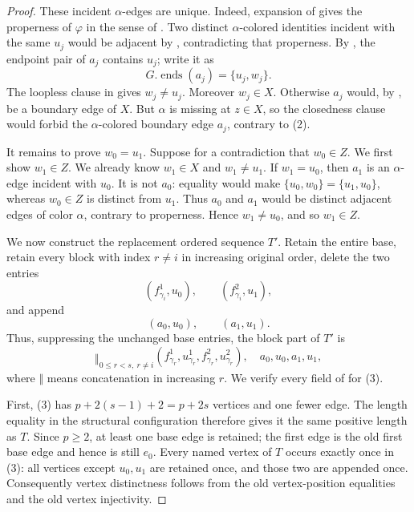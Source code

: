 \begin{proof}
These incident $\alpha$-edges are unique.  Indeed, expansion of
 gives the properness of $\varphi$ in the sense of
.  Two distinct $\alpha$-colored identities
incident with the same $u_j$ would be adjacent by
, contradicting that properness.  By
, the endpoint pair of $a_j$ contains $u_j$; write it
as
\[
 G.\operatorname{ends}(a_j)=\{u_j,w_j\}.
\]
The loopless clause in  gives $w_j\ne u_j$.
Moreover $w_j\in X$.  Otherwise $a_j$ would, by
, be a boundary edge of $X$.  But $\alpha$ is
missing at $z\in X$, so the closedness clause would forbid the
$\alpha$-colored boundary edge $a_j$, contrary to (2).

It remains to prove $w_0=u_1$.  Suppose for a contradiction that
$w_0\in Z$.  We first show $w_1\in Z$.  We already know $w_1\in X$ and
$w_1\ne u_1$.  If $w_1=u_0$, then $a_1$ is an $\alpha$-edge incident
with $u_0$.  It is not $a_0$: equality would make
$\{u_0,w_0\}=\{u_1,u_0\}$, whereas $w_0\in Z$ is distinct from $u_1$.
Thus $a_0$ and $a_1$ would be distinct adjacent edges of color $\alpha$,
contrary to properness.  Hence $w_1\ne u_0$, and so $w_1\in Z$.

We now construct the replacement ordered sequence $T'$.  Retain the
entire base, retain every block with index $r\ne i$ in increasing original
order, delete the two entries
\[
 (f^1_{\gamma_i},u_0),\qquad(f^2_{\gamma_i},u_1),
\]
and append
\[
 (a_0,u_0),\qquad(a_1,u_1).
\]
Thus, suppressing the unchanged base entries, the block part of $T'$ is
\[
 \mathop{\Vert}_{0\le r<s,\ r\ne i}
   (f^1_{\gamma_r},u^1_{\gamma_r},
    f^2_{\gamma_r},u^2_{\gamma_r}),
 \quad a_0,u_0,a_1,u_1,                                      \tag{3}
\]
where $\Vert$ means concatenation in increasing $r$.  We verify every
field of  for (3).

First, (3) has $p+2(s-1)+2=p+2s$ vertices and one fewer edge.  The
length equality in the structural configuration therefore gives it the
same positive length as $T$.  Since $p\geq2$, at least one base edge is
retained; the first edge is the old first base edge and hence is still
$e_0$.  Every named vertex of $T$ occurs exactly once in (3): all vertices
except $u_0,u_1$ are retained once, and those two are appended once.
Consequently vertex distinctness follows from the old vertex-position
equalities and the old vertex injectivity.


\end{proof}
